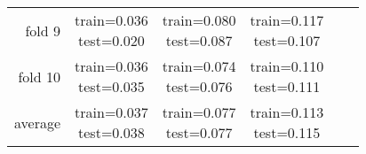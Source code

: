 \documentclass[12pt]{article}
\begin{document}
\begin{tabular}{ r|c|c|c|c|c| }
fold 9 & \shortstack{train=0.036 \\ test=0.020}& \shortstack{train=0.080 \\ test=0.087}& \shortstack{train=0.117 \\ test=0.107} \\\cline{2-4}
fold 10 & \shortstack{train=0.036 \\ test=0.035}& \shortstack{train=0.074 \\ test=0.076}& \shortstack{train=0.110 \\ test=0.111} \\\cline{2-4}
average & \shortstack{train=0.037 \\ test=0.038}& \shortstack{train=0.077 \\ test=0.077}& \shortstack{train=0.113 \\ test=0.115} \\\cline{2-4}
\end{tabular}
\end{document}
